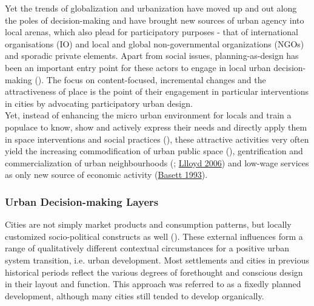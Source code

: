 \documentclass[11pt]{report}
\begin{document}
{{{Yet the trends of globalization and urbanization have moved up and out along the poles of decision-making and have brought new sources of urban agency into local arenas, which also plead for participatory purposes - that of international organisations (IO) and local and global non-governmental organizations (NGOs) and sporadic private elements. Apart from social issues, planning-as-design has been an important entry point for these actors to engage in local urban decision-making 
(\href{Van}{\citealt{van_assche_co-evolutions_2013}}).
The focus on content-focused, incremental changes  and the attractiveness of place is the point of their engagement in particular interventions in cities by advocating participatory urban design.
\\

Yet, instead of enhancing the micro urban environment for locals and train a populace to know, show and actively express their needs and directly apply them in space interventions and social practices
(\href{Ostrom}{\citealt{ostrom_governing_1995}}),
these attractive activities very often yield the increasing commodification of urban public space
(\href{Lehrer}{\citealt{lehrer_old_2008}}),
gentrification and commercialization of urban neighbourhoods
(\href{Zukin}{\citealt{zukin_cultures_1995}}; \href{Lloyd}{Llloyd 2006})
and low-wage services as only new source of economic activity
(\href{Basett}{Basett 1993}).

\subsubsection{Urban Decision-making Layers}

Cities are not simply market products and consumption patterns, but locally customized socio-political constructs as well (\href{marcuse}{\citealt{marcus_spatial_2007}}). These external influences form a range of qualitatively different contextual circumstances for a positive urban system transition, i.e. urban development. Most settlements and cities in previous historical periods reflect the various degrees of forethought and conscious design in their layout and function. This approach was referred to as a fixedly planned development, although many cities still tended to develop organically.
\\

}}}
\end{document}
